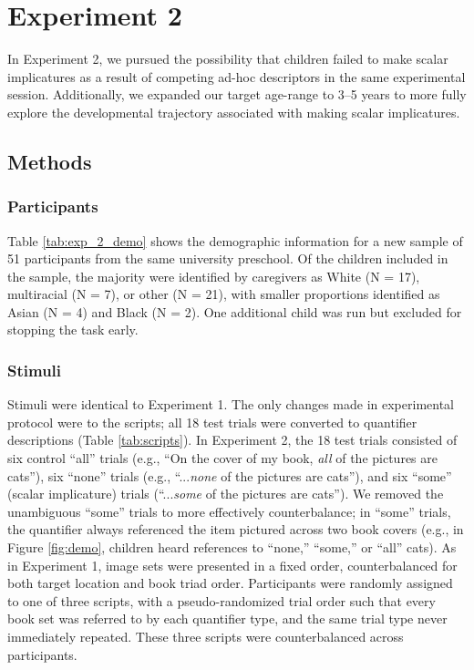 \documentclass[man]{apa2}
\begin{document}
\section{Experiment 2}

In Experiment 2, we pursued the possibility that children failed to make scalar implicatures as a result of competing ad-hoc descriptors in the same experimental session. Additionally, we expanded our target age-range to 3--5 years to more fully explore the developmental trajectory associated with making scalar implicatures.

\subsection{Methods}
\subsubsection{Participants}

Table \ref{tab:exp_2_demo} shows the demographic information for a new sample of 51 participants from the same university preschool. Of the children included in the sample, the majority were identified by caregivers as White (N = 17), multiracial (N = 7), or other (N = 21), with smaller proportions identified as Asian (N = 4) and Black (N = 2). One additional child was run but excluded for stopping the task early. 
\subsubsection{Stimuli}

Stimuli were identical to Experiment 1. The only changes made in experimental protocol were to the scripts;  all 18 test trials were converted to quantifier descriptions (Table \ref{tab:scripts}). In Experiment 2, the 18 test trials consisted of six control ``all'' trials (e.g., ``On the cover of my book, \textit{all} of the pictures are cats''), six ``none'' trials (e.g., ``...\textit{none} of the pictures are cats''), and six ``some'' (scalar implicature) trials (``...\textit{some} of the pictures are cats''). We removed the unambiguous ``some'' trials to more effectively counterbalance; in ``some'' trials, the quantifier always referenced the item pictured across two book covers (e.g., in Figure \ref{fig:demo}, children heard references to ``none,'' ``some,'' or ``all'' cats). As in Experiment 1, image sets were presented in a fixed order, counterbalanced for both target location and book triad order. Participants were randomly assigned to one of three scripts, with a pseudo-randomized trial order such that every book set was referred to by each quantifier type, and the same trial type never immediately repeated. These three scripts were counterbalanced across participants.
\end{document}
